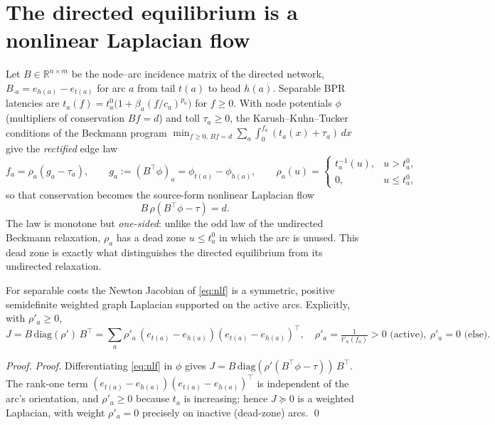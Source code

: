 \documentclass[ijoc]{informs3}
\newcommand{\R}{\mathbb{R}}
\begin{document}
\section{The directed equilibrium is a nonlinear Laplacian flow}\label{sec:formulation}
Let $B\in\R^{n\times m}$ be the node--arc incidence matrix of the directed network, $B_{\cdot a}=e_{h(a)}-e_{t(a)}$
for arc $a$ from tail $t(a)$ to head $h(a)$. Separable BPR latencies are $t_a(f)=t^0_a\big(1+\beta_a(f/c_a)^{p_a}\big)$
for $f\ge 0$. With node potentials $\phi$ (multipliers of conservation $Bf=d$) and toll $\tau_a\ge0$, the
Karush--Kuhn--Tucker conditions of the Beckmann program $\min_{f\ge0,\,Bf=d}\sum_a\int_0^{f_a}(t_a(x)+\tau_a)\,dx$
give the \emph{rectified} edge law
\begin{equation}\label{eq:rho}
f_a=\rho_a(g_a-\tau_a),\qquad g_a:=(B^\top\phi)_a=\phi_{t(a)}-\phi_{h(a)},\qquad
\rho_a(u)=\begin{cases} t_a^{-1}(u), & u> t^0_a,\\[1pt] 0, & u\le t^0_a,\end{cases}
\end{equation}
so that conservation becomes the source-form nonlinear Laplacian flow
\begin{equation}\label{eq:nlf}
B\,\rho(B^\top\phi-\tau)=d .
\end{equation}
The law is monotone but \emph{one-sided}: unlike the odd law of the undirected Beckmann relaxation, $\rho_a$ has a
dead zone $u\le t^0_a$ in which the arc is unused. This dead zone is exactly what distinguishes the directed
equilibrium from its undirected relaxation.

\begin{proposition}\label{prop:laplacian}
For separable costs the Newton Jacobian of \cref{eq:nlf} is a symmetric, positive semidefinite weighted graph
Laplacian supported on the active arcs. Explicitly, with $\rho'_a\ge0$,
\[
J=B\,\mathrm{diag}(\rho')\,B^\top=\sum_{a}\rho'_a\,(e_{t(a)}-e_{h(a)})(e_{t(a)}-e_{h(a)})^\top ,
\quad \rho'_a=\tfrac{1}{t'_a(f_a)}>0 \text{ (active)},\ \rho'_a=0 \text{ (else)}.
\]
\end{proposition}
\begin{proof}{\it Proof.}
Differentiating \cref{eq:nlf} in $\phi$ gives $J=B\,\mathrm{diag}(\rho'(B^\top\phi-\tau))\,B^\top$. The rank-one
term $(e_{t(a)}-e_{h(a)})(e_{t(a)}-e_{h(a)})^\top$ is independent of the arc's orientation, and $\rho'_a\ge0$
because $t_a$ is increasing; hence $J\succeq0$ is a weighted Laplacian, with weight $\rho'_a=0$ precisely on
inactive (dead-zone) arcs. \qed
\end{proof}
\end{document}
